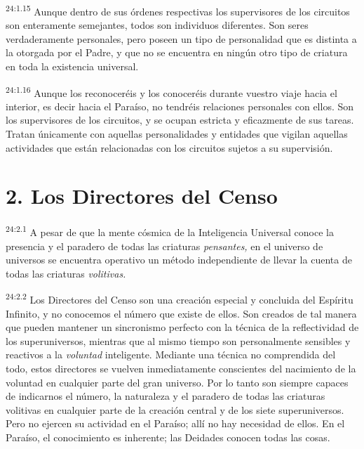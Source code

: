 \par
\textsuperscript{24:1.15} Aunque dentro de sus órdenes respectivas los supervisores de los circuitos son enteramente semejantes, todos son individuos diferentes. Son seres verdaderamente personales, pero poseen un tipo de personalidad que es distinta a la otorgada por el Padre, y que no se encuentra en ningún otro tipo de criatura en toda la existencia universal.

\par
\textsuperscript{24:1.16} Aunque los reconoceréis y los conoceréis durante vuestro viaje hacia el interior, es decir hacia el Paraíso, no tendréis relaciones personales con ellos. Son los supervisores de los circuitos, y se ocupan estricta y eficazmente de sus tareas. Tratan únicamente con aquellas personalidades y entidades que vigilan aquellas actividades que están relacionadas con los circuitos sujetos a su supervisión.

\section*{2. Los Directores del Censo}
\par
\textsuperscript{24:2.1} A pesar de que la mente cósmica de la Inteligencia Universal conoce la presencia y el paradero de todas las criaturas \textit{pensantes,} en el universo de universos se encuentra operativo un método independiente de llevar la cuenta de todas las criaturas \textit{volitivas.}

\par
\textsuperscript{24:2.2} Los Directores del Censo son una creación especial y concluida del Espíritu Infinito, y no conocemos el número que existe de ellos. Son creados de tal manera que pueden mantener un sincronismo perfecto con la técnica de la reflectividad de los superuniversos, mientras que al mismo tiempo son personalmente sensibles y reactivos a la \textit{voluntad} inteligente. Mediante una técnica no comprendida del todo, estos directores se vuelven inmediatamente conscientes del nacimiento de la voluntad en cualquier parte del gran universo. Por lo tanto son siempre capaces de indicarnos el número, la naturaleza y el paradero de todas las criaturas volitivas en cualquier parte de la creación central y de los siete superuniversos. Pero no ejercen su actividad en el Paraíso; allí no hay necesidad de ellos. En el Paraíso, el conocimiento es inherente; las Deidades conocen todas las cosas.

